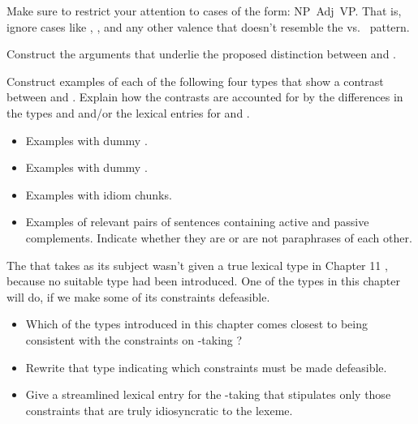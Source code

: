 \documentclass[a4paper,landscape,headrule,footrule]{foils}
\begin{document}
Make sure to restrict your attention to cases of the form: \hbox{NP
   Adj  VP}. That is, ignore cases like , , and
any other valence that doesn't resemble the  vs.\
 pattern.


Construct the arguments that underlie the proposed distinction between
\typ{orv-lxm} and \typ{ocv-lxm}.

Construct examples of each of the following four types that 
show a contrast between  and .  Explain how
the contrasts are accounted for by the differences in the types
 and  and/or the lexical entries for 
and \lex{persuade}.

\begin{itemize} \addtolength{\itemsep}{-1ex}
\item[(i)] Examples with dummy .

\item[(ii)] Examples with dummy .

\item[(iii)] Examples with idiom chunks.

\item[(iv)] Examples of relevant pairs of sentences containing 
active and passive complements.  Indicate whether they are or are
not paraphrases of each other.
\end{itemize}





The  that takes  as its subject wasn't given a true
lexical type in Chapter 11 \citep{sag:wasow:bender:2003}, because no
suitable type had been introduced.  One of the types in this chapter
will do, if we make some of its constraints defeasible.

\begin{itemize}
\item[A.] Which of the types introduced in this chapter comes
closest to being consistent with the constraints on -taking
\lex{be}?
\item[B.] Rewrite that type indicating which constraints must
be made defeasible.
\item[C.] Give a streamlined lexical entry for the -taking
\lex{be} that stipulates only those constraints that are truly
idiosyncratic to the lexeme.
\end{itemize}
\end{document}
